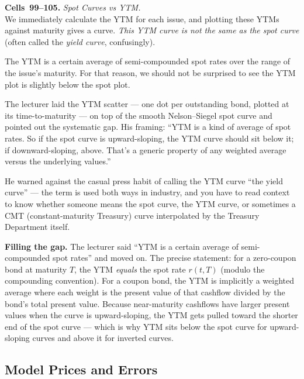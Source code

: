 \begin{keyblock}
\textbf{Cells~99--105.} \emph{Spot Curves vs YTM.}\\
We immediately calculate the YTM for each issue, and plotting these YTMs
against maturity gives a curve. \emph{This YTM curve is not the same as the
spot curve} (often called the \emph{yield curve}, confusingly).

The YTM is a certain average of semi-compounded spot rates over the range of
the issue's maturity. For that reason, we should not be surprised to see the
YTM plot is slightly below the spot plot.
\end{keyblock}

The lecturer laid the YTM scatter --- one dot per outstanding bond, plotted
at its time-to-maturity --- on top of the smooth Nelson--Siegel spot curve
and pointed out the systematic gap. His framing: ``YTM is a kind of average
of spot rates. So if the spot curve is upward-sloping, the YTM curve should
sit below it; if downward-sloping, above. That's a generic property of any
weighted average versus the underlying values.''

He warned against the casual press habit of calling the YTM curve ``the yield
curve'' --- the term is used both ways in industry, and you have to read
context to know whether someone means the spot curve, the YTM curve, or
sometimes a CMT (constant-maturity Treasury) curve interpolated by the
Treasury Department itself.

\begin{tipblock}
\textbf{Filling the gap.} The lecturer said ``YTM is a certain average of
semi-compounded spot rates'' and moved on. The precise statement: for a
zero-coupon bond at maturity $T$, the YTM \emph{equals} the spot rate $r(t,T)$
(modulo the compounding convention). For a coupon bond, the YTM is implicitly
a weighted average where each weight is the present value of that cashflow
divided by the bond's total present value. Because near-maturity cashflows
have larger present values when the curve is upward-sloping, the YTM gets
pulled toward the shorter end of the spot curve --- which is why YTM sits
below the spot curve for upward-sloping curves and above it for inverted
curves.
\end{tipblock}

\subsection{Model Prices and Errors}\label{L1-sec:errors}

